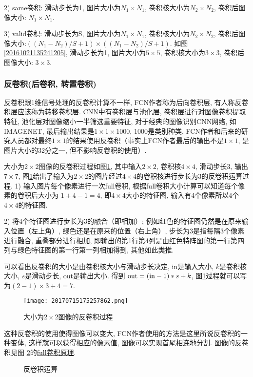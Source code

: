 2) same卷积: 滑动步长为1, 图片大小为$N_1\times N_1$, 卷积核大小为$N_2\times N_2$, 卷积后图像大小: $N_1\times N_1$.

3) valid卷积: 滑动步长为S, 图片大小为$N_1\times N_1$, 卷积核大小为$N_2\times N_2$, 卷积后图像大小:$((N_1-N_2)/S+1) \times ((N_1-N_2)/S+1)$.
如图 \ref{20161021135241205}, 滑动步长为1, 图片大小为$5\times 5$, 卷积核大小为$3\times 3$, 卷积后图像大小: $3\times 3$.

\subsubsection{反卷积(后卷积, 转置卷积)}

反卷积跟1维信号处理的反卷积计算不一样, FCN作者称为后向卷积层, 有人称反卷积层应该称为转移卷积层.
CNN中有卷积层与池化层, 卷积层进行对图像卷积提取特征, 池化层对图像缩小一半筛选重要特征, 对于经典的图像识别CNN网络, 如IMAGENET, 最后输出结果是$1\times 1\times 1000$, 1000是类别种类.
FCN作者和后来的研究人员都对最终$1\times 1$的结果使用反卷积（事实上FCN作者最后的输出不是$1\times 1$, 是图片大小的32分之一, 但不影响反卷积的使用）.
\begin{example}
大小为$2\times 2$图像的反卷积过程如图\ref{20170715175257862}, 其中输入$2\times 2$, 卷积核$4\times 4$, 滑动步长3, 输出$7\times 7$, 图\ref{20170715175257862}给出了输入为$2\times 2$的图片经过$4\times 4$的卷积核进行步长为3的反卷积运算过程.
1) 输入图片每个像素进行一次full卷积, 根据full卷积大小计算可以知道每个像素的卷积后大小为 $1+4-1=4$,  即$4\times 4$大小的特征图, 输入有4个像素所以4个$4\times 4$的特征图.

2) 将4个特征图进行步长为3的融合（即相加）; 例如红色的特征图仍然是在原来输入位置（左上角）, 绿色还是在原来的位置（右上角）, 步长为3是指每隔3个像素进行融合, 重叠部分进行相加, 即输出的第1行第4列是由红色特阵图的第一行第四列与绿色特征图的第一行第一列相加得到, 其他如此类推.

可以看出反卷积的大小是由卷积核大小与滑动步长决定, in是输入大小, $k$是卷积核大小, $s$是滑动步长, out是输出大小.
得到 $\textup{out} = (\textup{in} - 1) * s + k$, 图\ref{20170715175257862}过程就可以写为$(2 - 1)\times 3 + 4 = 7$.
\begin{figure}[H]
\centering
\texttt{[image: 20170715175257862.png]}
\caption{大小为$2\times 2$图像的反卷积过程}
\label{20170715175257862}
\end{figure}
\vspace{-0.4cm}
\end{example}
这种反卷积的使用使得图像可以变大, FCN作者使用的方法是这里所说反卷积的一种变体, 这样就可以获得相应的像素值, 图像可以实现首尾相连地分割. 图像的反卷积见图 \ref{Dconop0203}的\href{https://github.com/vdumoulin/conv_arithmetic}{full卷积原理}.
\begin{figure}[H]
\centering
{}
\caption{反卷积运算}
\label{Dconop0203}
\end{figure}

